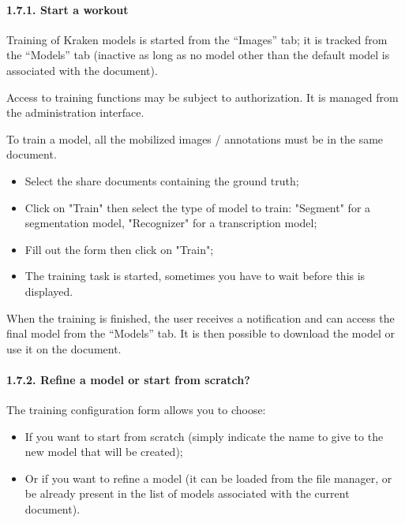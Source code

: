 \documentclass[
]{book}
\begin{document}
\hypertarget{start-a-workout}{%
\paragraph{1.7.1. Start a workout}\label{start-a-workout}}

Training of Kraken models is started from the ``Images'' tab; it is
tracked from the ``Models'' tab (inactive as long as no model other than
the default model is associated with the document).

Access to training functions may be subject to authorization. It is
managed from the administration interface.

To train a model, all the mobilized images / annotations must be in the
same document.

\begin{itemize}
\item
  Select the share documents containing the ground truth;
\item
  Click on "Train" then select the type of model to train:
  "Segment" for a segmentation model, "Recognizer" for a
  transcription model;
\item
  Fill out the form then click on "Train";
\item
  The training task is started, sometimes you have to wait before this
  is displayed.
\end{itemize}

When the training is finished, the user receives a notification and can
access the final model from the ``Models'' tab. It is then possible to
download the model or use it on the document.

\hypertarget{refine-a-model-or-start-from-scratch}{%
\paragraph{1.7.2. Refine a model or start from scratch?}\label{refine-a-model-or-start-from-scratch}}

The training configuration form allows you to choose:

\begin{itemize}
\item
  If you want to start from scratch (simply indicate the name to give
  to the new model that will be created);
\item
  Or if you want to refine a model (it can be loaded from the file
  manager, or be already present in the list of models associated with
  the current document).
\end{itemize}
\end{document}
